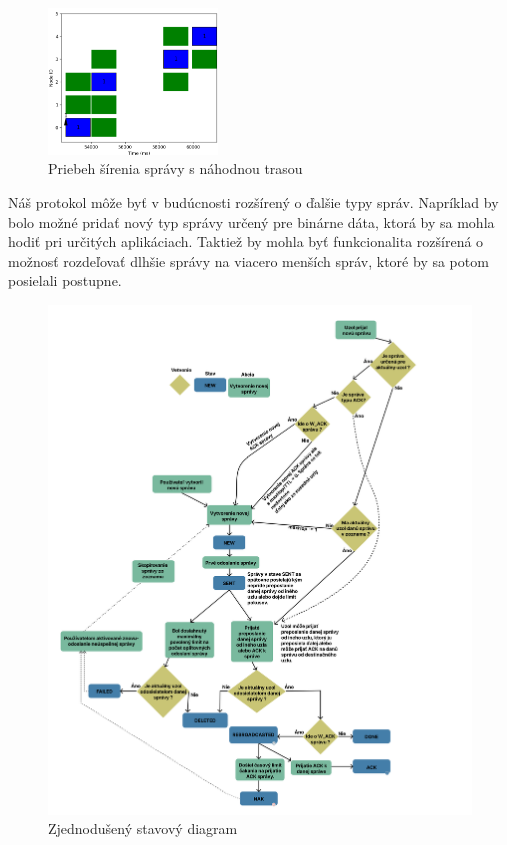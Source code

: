 \documentclass[slovak,master]{diploma}
\begin{document}
\begin{figure}[h!]
  \centering
  \includegraphics[width=0.4\textwidth]{Figures/randomizePath.png}
  \caption{Priebeh šírenia správy s náhodnou trasou}
  \label{fig:randomizePath}
\end{figure}

Náš protokol môže byť v budúcnosti rozšírený o ďalšie typy správ. Napríklad by bolo možné pridať nový typ správy určený pre binárne dáta, 
ktorá by sa mohla hodiť pri určitých aplikáciach. 
Taktiež by mohla byť funkcionalita rozšírená o možnosť rozdeľovať dlhšie správy na viacero menších správ, ktoré by sa potom posielali postupne.

\printbibliography[title={Literatura}, heading=bibintoc]

\appendix
\begin{figure}[]
  \centering
  \includegraphics[width=1\textwidth]{Figures/state_flow_W.png}
  \caption{Zjednodušený stavový diagram}
  \label{fig:stateDiagram}
\end{figure}
\end{document}
